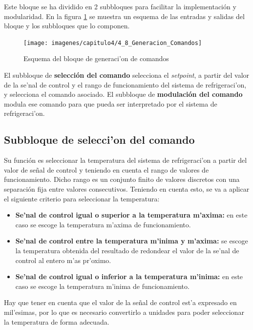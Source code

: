 {	Este bloque se ha dividido en 2 subbloques para facilitar la implementación y modularidad. En la figura \ref{4_8:diag_generacion_comandos} se muestra un esquema de las entradas y salidas del bloque y los subbloques que lo componen.

\begin{figure}[htbp]
  \centering
  \texttt{[image: imagenes/capitulo4/4\_8\_Generacion\_Comandos]}
   \caption{Esquema del bloque de generaci'on de comandos}
   \label{4_8:diag_generacion_comandos}
\end{figure}

	El subbloque de \textbf{selección del comando} selecciona el \textit{setpoint}, a partir del valor de la se'nal de control y el rango de funcionamiento del sistema de refrigeraci'on, y selecciona el comando asociado. El subbloque de \textbf{modulación del comando} modula ese comando para que pueda ser interpretado por el sistema de refrigeraci'on. 

\subsection{Subbloque de selecci'on del comando}\label{subsec:seleccionComando}

Su función es seleccionar la temperatura del sistema de refrigeraci'on a partir del valor de señal de control y teniendo en cuenta el rango de valores de funcionamiento. Dicho rango es un conjunto finito de valores discretos con una separación fija entre valores consecutivos. Teniendo en cuenta esto, se va a aplicar el siguiente criterio para seleccionar la temperatura:

\begin{itemize}
\item\textbf{Se'nal de control igual o superior a la temperatura m'axima:} en este caso se escoge la temperatura m'axima de funcionamiento. 
\item\textbf{Se'nal de control entre la temperatura m'inima y m'axima:} se escoge la temperatura obtenida del resultado de redondear el valor de la se'nal de control al entero m'as pr'oximo.
\item\textbf{Se'nal de control igual o inferior a la temperatura m'inima:} en este caso se escoge la temperatura m'inima de funcionamiento. 
\end{itemize}

	Hay que tener en cuenta que el valor de la señal de control est'a expresado en mil'esimas, por lo que es necesario convertirlo a unidades para poder seleccionar la temperatura de forma adecuada.

}

